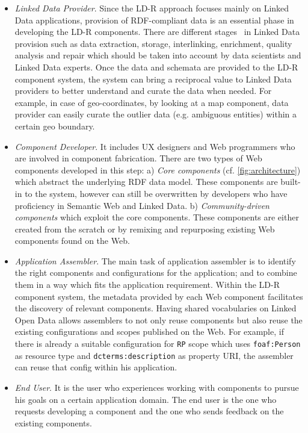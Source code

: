 \documentclass{acm_proc_article-sp}
\begin{document}
\begin{itemize}

\item \emph{Linked Data Provider}.
Since the LD-R approach focuses mainly on Linked Data applications, provision of RDF-compliant data is an essential phase in developing the LD-R components.
There are different stages~\cite{AuerLOD2} in Linked Data provision such as data extraction, storage, interlinking, enrichment, quality analysis and repair which should be taken into account by data scientists and Linked Data experts.
Once the data and schemata are provided to the LD-R component system, the system can bring a reciprocal value to Linked Data providers to better understand and curate the data when needed.
For example, in case of geo-coordinates, by looking at a map component, data provider can easily curate the outlier data (e.g. ambiguous entities) within a certain geo boundary.

\item \emph{Component Developer}. 
It includes UX designers and Web programmers who are involved in component fabrication.
There are two types of Web components developed in this step:
a) \emph{Core components} (cf. \autoref{fig:architecture}) which abstract the underlying RDF data model.
These components are built-in to the system, however can still be overwritten by developers who have proficiency in Semantic Web and Linked Data.
b) \emph{Community-driven components} which exploit the core components.
These components are either created from the scratch or by remixing and repurposing existing Web components found on the Web.

\item \emph{Application Assembler}.
The main task of application assembler is to identify the right components and configurations for the application; and to combine them in a way which fits the application requirement. 
Within the LD-R component system, the metadata provided by each Web component facilitates the discovery of relevant components.
Having shared vocabularies on Linked Open Data allows assemblers to not only reuse components but also reuse the existing configurations and scopes published on the Web.
For example, if there is already a suitable configuration for \texttt{RP} scope which uses \texttt{foaf:Person} as resource type and \texttt{dcterms:description} as property URI, the assembler can reuse that config within his application.

\item \emph{End User}. 
It is the user who experiences working with components to pursue his goals on a certain application domain.
The end user is the one who requests developing a component and the one who sends feedback on the existing components.

\end{itemize}
\end{document}
